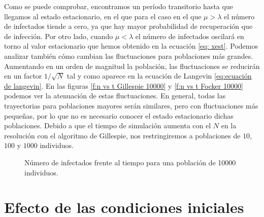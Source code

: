 Como se puede comprobar, encontramos un período transitorio hasta que llegamos al estado estacionario, en el que para el caso en el que 
$\mu > \lambda$ el número de infectados tiende a cero, ya que hay mayor probabilidad de recuperación que de infección. Por otro lado, cuando
$\mu < \lambda$ el número de infectados oscilará en torno al valor estacionario que hemos obtenido en la ecuación \ref{eq: xest}.
\newpage
Podemos analizar también cómo cambian las fluctuaciones para poblaciones más grandes. Aumentando en un orden de magnitud la población, las 
fluctuaciones se reducirán en un factor $1/\sqrt{N}$ tal y como aparece en la ecuación de Langevin \ref{eq:ecuación de langevin}. En las figuras  
\ref{f:n vs t Gillespie 10000} y \ref{f:n vs t Focker 10000} podemos ver la atenuación de estas fluctuaciones. En general, todas las trayectorias
para poblaciones mayores serán similares, pero con fluctuaciones más pequeñas, por lo que no es necesario conocer el estado estacionario 
dichas poblaciones. Debido a que el tiempo de simulación aumenta con el $N$ en la resolución con el algoritmo de Gillespie, 
nos restringiremos a poblaciones de $10$, $100$ y $1000$ individuos. 

\begin{figure}[H]
    \begin{center}
      \begin{subfigure}
          [Gillespie.]{
          \texttt{[image: ni\_t\_10000.png]}
          \label{f:n vs t Gillespie 10000}}
      \end{subfigure}
  
      \vspace{0.5cm}
      
      \begin{subfigure}
          [Langevin.]{
          \texttt{[image: x vs t fockerplanck 10000.png]}
          \label{f:n vs t Focker 10000}}
      \end{subfigure}
      
      \caption{Número de infectados frente al tiempo para una población de 10000 individuos.}
      \label{f:n vs t 10000}
    \end{center}    
\end{figure}


\section{Efecto de las condiciones iniciales}\label{sec:ccii}

